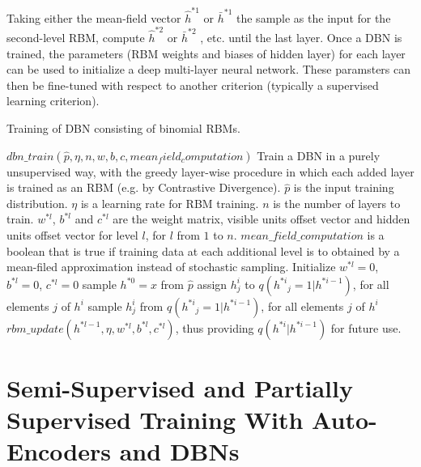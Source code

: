 \documentclass[runningheads,openany]{xhlPaper}
\begin{document}
Taking either the mean-field vector ${\hat h^{*1}}$ or ${\bar h^{*1}}$ the sample as the input for the second-level RBM, compute ${\hat h^{*2}}$ or ${\bar h^{*2}}$ , etc. until the last layer.
Once a DBN is trained, the parameters (RBM weights and biases of hidden layer) for each layer can be used to initialize a deep multi-layer neural network.
These paramsters can then be fine-tuned with respect to another criterion (typically a supervised learning criterion).

\begin{algorithm}
\caption{Training of DBN consisting of binomial RBMs.}
\label{fig:dbn_training}
\begin{algorithmic}
\STATE $dbn\_train({\hat p}, \eta, n, w, b, c, mean_field_computation)$
\STATE Train a DBN in a purely unsupervised way, with the greedy layer-wise procedure in which each added layer is trained as an RBM (e.g. by Contrastive Divergence).
\STATE $\hat p$ is the input training distribution.
\STATE $\eta$ is a learning rate for RBM training.
\STATE $n$ is the number of layers to train.
\STATE $w^{*l}$, $b^{*l}$ and $c^{*l}$ are the weight matrix, visible units offset vector and hidden units offset vector for level $l$, for $l$ from $1$ to $n$.
\STATE $mean\_field\_computation$ is a boolean that is true if training data at each additional level is to obtained by a mean-filed approximation instead of stochastic sampling.
	\STATE Initialize $w^{*l} = 0$, $b^{*l} = 0$, $c^{*l} = 0$
		\STATE sample $h^{*0} = x$ from $\hat p$
				\STATE assign $h^{i}_{j}$ to $q\left( {{h^{*i}}_j = 1|{h^{*i - 1}}} \right)$, for all elements $j$ of $h^{i}$
			\ELSE
				\STATE sample $h^{i}_{j}$ from $q\left( {{h^{*i}}_j = 1|{h^{*i - 1}}} \right)$, for all elements $j$ of $h^{i}$
			\ENDIF
		\ENDFOR
		\STATE $rbm\_update(h^{*l-1}, \eta, w^{*l}, b^{*l}, c^{*l})$, thus providing $q\left( {{h^{*i}}|{h^{*i - 1}}} \right)$ for future use.
	\ENDWHILE
\ENDFOR
\end{algorithmic}
\end{algorithm}

\section{Semi-Supervised and Partially Supervised Training With Auto-Encoders and DBNs}
\end{document}
